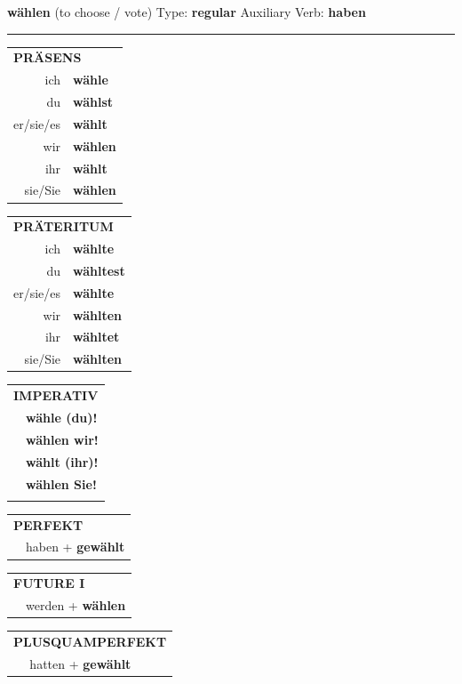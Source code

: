 \documentclass[10pt,a4paper]{revtex4-2}
\begin{document}
\begin{verbbox-acc}
    {\Large \bf wählen} (to choose / vote) \hfill Type: \textbf{regular} \hfill Auxiliary Verb: \textbf{haben} 
    
     \vspace{5pt}

    \hrule
    
    \vspace{5pt}

  \begin{tabular}{rl}
     \multicolumn{2}{l}{\textbf{PRÄSENS} }\\
    ich & \textbf{wähle}\\
    du & \textbf{wählst}\\
    er/sie/es & \textbf{wählt}\\
    wir & \textbf{wählen}\\
    ihr & \textbf{wählt}\\
    sie/Sie & \textbf{wählen}\\
  \end{tabular}
  \hfill
  \begin{tabular}{rl}
    \multicolumn{2}{l}{\textbf{PRÄTERITUM} }\\
    ich & \textbf{wählte}\\
    du & \textbf{wähltest}\\
    er/sie/es & \textbf{wählte}\\
    wir & \textbf{wählten}\\
    ihr & \textbf{wähltet}\\
    sie/Sie & \textbf{wählten}\\
  \end{tabular}
  \hfill
  \begin{tabular}{rl}
     \multicolumn{2}{l}{\textbf{IMPERATIV} }\\
   & \textbf{wähle (du)!}\\
   & \textbf{wählen wir!}\\
   & \textbf{wählt (ihr)!}\\
   & \textbf{wählen Sie!}\\
   & \vspace{10pt}
  \end{tabular}

 \vspace{10pt}

 \begin{tabular}{rl}
     \multicolumn{2}{l}{\textbf{PERFEKT}}\\
   & haben + \textbf{gewählt}\\
  \end{tabular}
\hfill
\begin{tabular}{rl}
    \multicolumn{2}{l}{\textbf{FUTURE I}}\\
   & werden + \textbf{wählen}\\
  \end{tabular}
\hfill
\begin{tabular}{rl}
    \multicolumn{2}{l}{\textbf{PLUSQUAMPERFEKT}}\\
   & hatten + \textbf{gewählt}\\
  \end{tabular}


\end{verbbox-acc}
\end{document}
